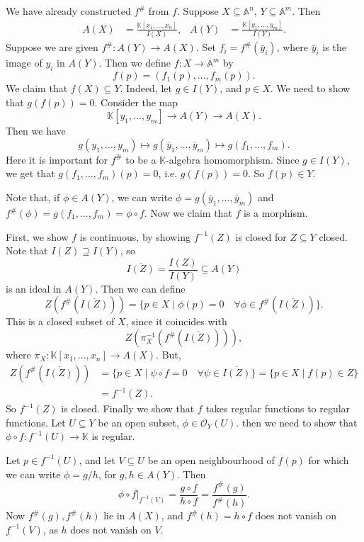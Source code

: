 \documentclass[12pt]{article}
\begin{document}
\begin{proofbox}
	We have already constructed $f^{\#}$ from $f$. Suppose $X \subseteq \mathbb{A}^n$, $Y \subseteq \mathbb{A}^m$. Then
	\begin{align*}
		A(X) &= \frac{\mathbb{K}[x_1, \ldots, x_n]}{I(X)}, & A(Y) &= \frac{\mathbb{K}[y_1, \ldots, y_m]}{I(Y)}.
	\end{align*}
	Suppose we are given $f^{\#} : A(Y) \to A(X)$. Set $f_i = f^{\#}(\bar y_i)$, where $\bar y_i$ is the image of $y_i$ in $A(Y)$. Then we define $f : X \to \mathbb{A}^m$ by
	\[
	f(p) = (f_1(p), \ldots, f_m(p)).
	\]
	We claim that $f(X) \subseteq Y$. Indeed, let $g \in I(Y)$, and $p \in X$. We need to show that $g(f(p)) = 0$. Consider the map
	\[
		\mathbb{K}[y_1, \ldots, y_m] \to A(Y) \to A(X).
	\]
	Then we have
	\[
		g(y_1, \ldots, y_m) \mapsto g(\bar y_1, \ldots, \bar y_m) \mapsto g(f_1, \ldots, f_m).
	\]
	Here it is important for $f^{\#}$ to be a $\mathbb{K}$-algebra homomorphism. Since $g \in I(Y)$, we get that $g(f_1, \ldots, f_m)(p) = 0$, i.e. $g(f(p)) = 0$. So $f(p) \in Y$.

	Note that, if $\phi \in A(Y)$, we can write $\phi = g(\bar y_1, \ldots, \bar y_m)$ and $f^{\#}(\phi) = g(f_1, \ldots, f_m) = \phi \circ f$. Now we claim that $f$ is a morphism.

	First, we show $f$ is continuous, by showing $f^{-1}(Z)$ is closed for $Z \subseteq Y$ closed. Note that $I(Z) \supseteq I(Y)$, so
	\[
	\overline{I(Z)} = \frac{I(Z)}{I(Y)} \subseteq A(Y)
	\]
	is an ideal in $A(Y)$. Then we can define
	\[
		Z(f^{\#}(\overline{I(Z)})) = \{p \in X \mid \phi(p) = 0 \quad \forall \phi \in f^{\#}(\overline{I(Z)})\}.
	\]
	This is a closed subset of $X$, since it coincides with
	\[
	Z(\pi_X^{-1}(f^{\#}(\overline{I(Z)}))),
	\]
	where $\pi_X : \mathbb{K}[x_1, \ldots, x_n] \to A(X)$. But,
	\begin{align*}
		Z(f^{\#}(\overline{I(Z)})) &= \{p \in X \mid \psi \circ f = 0 \quad \forall\psi \in \overline{I(Z)}\} = \{p \in X \mid f(p) \in Z\} \\
					   &= f^{-1}(Z).
	\end{align*}
	So $f^{-1}(Z)$ is closed.
	Finally we show that $f$ takes regular functions to regular functions. Let $U \subseteq Y$ be an open subset, $\phi \in \mathcal{O}_Y(U)$. then we need to show that $\phi \circ f : f^{-1}(U) \to \mathbb{K}$ is regular.

	Let $p \in f^{-1}(U)$, and let $V \subseteq U$ be an open neighbourhood of $f(p)$ for which we can write $\phi = g/h$, for $g, h \in A(Y)$. Then
	\[
	\phi \circ f|_{f^{-1}(V)} = \frac{g \circ f}{h \circ f} = \frac{f^{\#}(g)}{f^{\#}(h)}.
	\]
	Now $f^{\#}(g), f^{\#}(h)$ lie in $A(X)$, and $f^{\#}(h) = h \circ f$ does not vanish on $f^{-1}(V)$, as $h$ does not vanish on $V$.
\end{proofbox}
\end{document}
